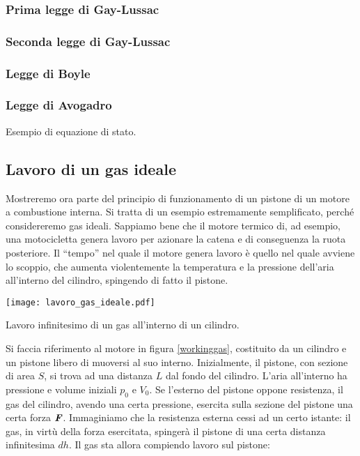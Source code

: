 \subsubsection*{Prima legge di Gay-Lussac}
\subsubsection*{Seconda legge di Gay-Lussac}
\subsubsection*{Legge di Boyle}

\subsubsection*{Legge di Avogadro}
Esempio di equazione di stato.

\subsection{Lavoro di un gas ideale}
Mostreremo ora parte del principio di funzionamento di un pistone
di un motore a combustione interna. Si tratta di un esempio estremamente
semplificato, perché considereremo gas ideali.
Sappiamo bene che il motore termico di, ad esempio, una motocicletta
genera lavoro per azionare la catena e di conseguenza la ruota posteriore.
Il ``tempo'' nel quale il motore genera lavoro è quello nel quale
avviene lo scoppio, che aumenta violentemente la temperatura e la
pressione dell'aria all'interno del cilindro, spingendo di fatto il
pistone.

\begin{marginfigure}
    \centering
    \texttt{[image: lavoro\_gas\_ideale.pdf]}
    \caption{Lavoro infinitesimo di un gas all'interno di un cilindro.}
    \label{workinggas}
\end{marginfigure}

Si faccia riferimento al motore in figura \ref{workinggas}, costituito
da un cilindro e un pistone libero di muoversi al suo interno. Inizialmente, il pistone,
con sezione di area $S$, si trova ad una distanza $L$ dal fondo del cilindro.
L'aria all'interno ha pressione e volume iniziali $p_0$ e $V_0$. Se l'esterno
del pistone oppone resistenza, il gas del cilindro, avendo una certa pressione,
esercita sulla sezione del pistone una certa forza $\textbf{\textit{F}}$. Immaginiamo
che la resistenza esterna cessi ad un certo istante: il gas, in virtù della forza
esercitata, spingerà il pistone di una certa distanza infinitesima $dh$.
Il gas sta allora compiendo lavoro sul pistone:

